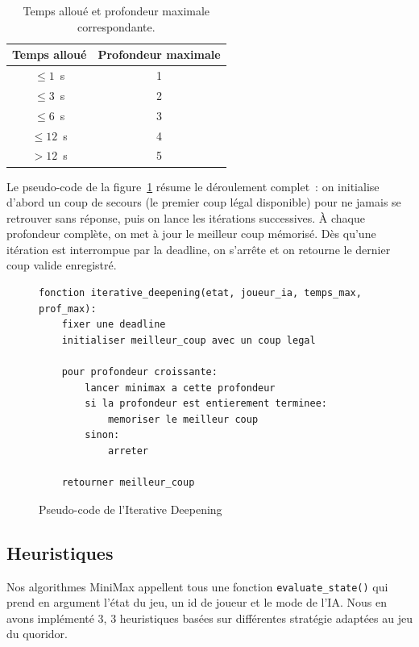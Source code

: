 \documentclass[a4paper]{article}
\begin{document}
\begin{table}[H]
\centering
\begin{tabular}{cc}
  \hline
  \textbf{Temps alloué} & \textbf{Profondeur maximale} \\
  \hline
  $\leq 1$~s  & 1 \\
  $\leq 3$~s  & 2 \\
  $\leq 6$~s  & 3 \\
  $\leq 12$~s & 4 \\
  $> 12$~s    & 5 \\
  \hline
\end{tabular}
\caption{Temps alloué et profondeur maximale correspondante.}
\label{tab:time-depth}
\end{table}

Le pseudo-code de la figure~\ref{fig:iterative-deepening-pseudocode} résume
le déroulement complet~: on initialise d'abord un coup de secours (le premier
coup légal disponible) pour ne jamais se retrouver sans réponse, puis on lance
les itérations successives. À chaque profondeur complète, on met à jour le
meilleur coup mémorisé. Dès qu'une itération est interrompue par la deadline,
on s'arrête et on retourne le dernier coup valide enregistré.

\begin{figure}[H]
{\small
\begin{verbatim}
fonction iterative_deepening(etat, joueur_ia, temps_max, prof_max):
    fixer une deadline
    initialiser meilleur_coup avec un coup legal

    pour profondeur croissante:
        lancer minimax a cette profondeur
        si la profondeur est entierement terminee:
            memoriser le meilleur coup
        sinon:
            arreter

    retourner meilleur_coup
\end{verbatim}
}
\caption{Pseudo-code de l'Iterative Deepening}
\label{fig:iterative-deepening-pseudocode}
\end{figure}




\subsection{Heuristiques}

Nos algorithmes MiniMax appellent tous une fonction \texttt{evaluate\_state()} qui prend en argument l’état du jeu, un id de 
joueur et le mode de l’IA. Nous en avons implémenté 3, 3 heuristiques basées sur différentes stratégie adaptées au jeu du quoridor. 
\end{document}
